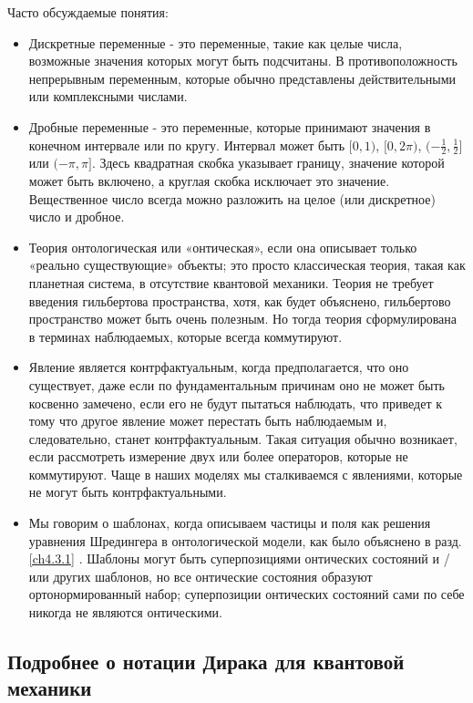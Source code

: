 \documentclass[main.tex]{subfiles}
\begin{document}
Часто обсуждаемые понятия:
\begin{itemize}
	\item Дискретные переменные - это переменные, такие как целые числа, возможные значения которых могут быть подсчитаны. В противоположность непрерывным переменным, которые обычно представлены действительными или комплексными числами.
    
    \item Дробные переменные - это переменные, которые принимают значения в конечном интервале или по кругу. Интервал может быть $[0, 1)$, $[0, 2\pi)$, $(-\frac 1 2, \frac 1 2]$ или $(-\pi, \pi]$. Здесь квадратная скобка указывает границу, значение которой может быть включено, а круглая скобка исключает это значение. Вещественное число всегда можно разложить на целое (или дискретное) число и дробное.

    \item Теория онтологическая или «онтическая», если она описывает только «реально существующие» объекты; это просто классическая теория, такая как планетная система, в отсутствие квантовой механики. Теория не требует введения гильбертова пространства, хотя, как будет объяснено, гильбертово пространство может быть очень полезным. Но тогда теория сформулирована в терминах наблюдаемых, которые всегда коммутируют.

    \item Явление является контрфактуальным, когда предполагается, что оно существует, даже если по фундаментальным причинам оно не может быть косвенно замечено, если его не будут пытаться наблюдать, что приведет к тому что другое явление может перестать быть наблюдаемым и, следовательно, станет контрфактуальным. Такая ситуация обычно возникает, если рассмотреть измерение двух или более операторов, которые не коммутируют. Чаще в наших моделях мы сталкиваемся с явлениями, которые не могут быть контрфактуальными.

    \item Мы говорим о шаблонах, когда описываем частицы и поля как решения уравнения Шредингера в онтологической модели, как было объяснено в разд. \ref{ch4.3.1} . Шаблоны могут быть суперпозициями онтических состояний и / или других шаблонов, но все онтические состояния образуют ортонормированный набор; суперпозиции онтических состояний сами по себе никогда не являются онтическими.
\end{itemize}


\subsection{Подробнее о нотации Дирака для квантовой механики}\label{ch11.3}
\end{document}
